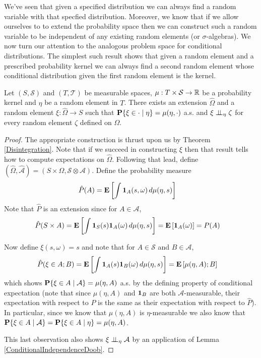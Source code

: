  We've seen that given a specified distribution we can always find a
random variable with that specfied distribution.  Moreover, we know
that if we allow ourselves to to extend the probability space then we
can construct such a random variable to be independent of any existing
random elements (or $\sigma$-algebras).  We now turn our attention to
the analogous problem space for conditional distributions.  The
simplest such result shows that given a random element and a
prescribed probability kernel we can always find a second random
element whose conditional distribution given the first random element is the kernel.
\begin{lem}Let $(S, \mathcal{S})$ and $(T, \mathcal{T})$ be measurable
  spaces, $\mu : T \times \mathcal{S} \to \mathbb{R}$ be a
  probability kernel and $\eta$ be a random element in $T$.  There
  exists an extension $\hat{\Omega}$ and a random element $\xi : \hat{\Omega} \to S$
  such that $\textbf{P}\{\xi \in \cdot \mid \eta\} = \mu(\eta, \cdot)$
  a.s.   and $\xi \perp \! \! \! \perp_{\eta} \zeta$ for every random element
  $\zeta$ defined on $\Omega$.
\end{lem}
\begin{proof}
The appropriate construction is thrust upon us by Theorem
\ref{Disintegration}.  Note that if we succeed in constructing $\xi$
then that result tells how to compute expectations on $\hat{\Omega}$.
Following that lead, define
$(\hat{\Omega}, \hat{\mathcal{A}}) = (S \times \Omega,
\mathcal{S} \otimes \mathcal{A})$.  Define the probability measure 
\begin{align*}
\hat{P}(A) &= \textbf{E}\left[\int \textbf{1}_{A}(s,\omega) \,
  d\mu(\eta, s)\right]
\end{align*}
Note that $\hat{P}$ is an extension since for $A \in \mathcal{A}$, 
\begin{align*}
\hat{P}(S \times A) &= \textbf{E}\left[\int \textbf{1}_{S}(s)\textbf{1}_{A}(\omega) \,
  d\mu(\eta, s)\right] = \textbf{E}\left[\textbf{1}_{A}(\omega)\right] = P(A)
\end{align*}

Now define $\xi(s, \omega) = s$ and note that for $A \in \mathcal{S}$
and $B \in \mathcal{A}$, 
\begin{align*}
\hat{P}(\xi \in A ; B) &=  \textbf{E}\left[\int \textbf{1}_{A}(s)\textbf{1}_{B}(\omega) \,
  d\mu(\eta, s)\right] = \textbf{E}\left[\mu(\eta, A) ; B\right]
\end{align*}
which shows $\textbf{P}\{\xi \in A \mid \mathcal{A}\}= \mu(\eta, A)$ a.s. 
by the defining property of conditional expectation (note that since
$\mu(\eta, A)$ and $\textbf{1}_{B}$ are both
$\mathcal{A}$-measurable, their expectation with respect to $P$ is the
same as their expectation with respect to $\hat{P}$).  In particular,
since we know that $\mu(\eta, A)$ is $\eta$-measurable we also know
that $\textbf{P}\{\xi \in A \mid \mathcal{A}\}=\textbf{P}\{\xi \in A \mid \eta\} = \mu(\eta, A)$.

This last observation also shows $\xi \perp \! \! \! \perp_{\eta} \mathcal{A}$ by an application of Lemma \ref{ConditionalIndependenceDoob}.
\end{proof}

